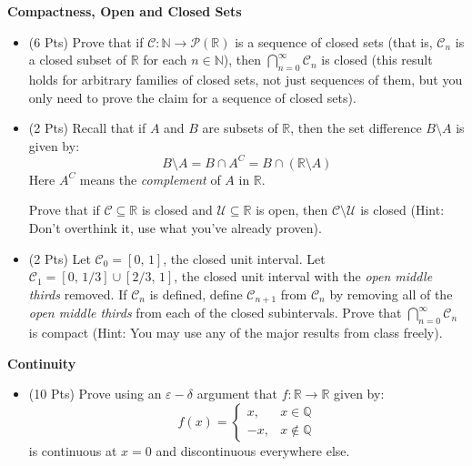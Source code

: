 \documentclass{article}
\begin{document}
    \newpage
    \textbf{Compactness, Open and Closed Sets}
    \begin{itemize}
        \item (6 Pts)
            Prove that if
            $\mathcal{C}:\mathbb{N}\rightarrow\mathcal{P}(\mathbb{R})$ is a
            sequence of closed sets (that is, $\mathcal{C}_{n}$ is a closed
            subset of $\mathbb{R}$ for each $n\in\mathbb{N}$), then
            $\bigcap_{n=0}^{\infty}\mathcal{C}_{n}$ is closed
            (this result holds for arbitrary families of closed sets, not
            just sequences of them, but you only need to prove the claim
            for a sequence of closed sets).
        \item
            (2 Pts)
            Recall that if $A$ and $B$ are subsets of $\mathbb{R}$, then
            the set difference $B\setminus{A}$ is given by:
            \begin{equation}
                B\setminus{A}
                =
                B\cap{A}^{C}
                =
                B\cap\left(\mathbb{R}\setminus{A}\right)
            \end{equation}
            Here $A^{C}$ means the \textit{complement} of $A$ in $\mathbb{R}$.

            Prove that if $\mathcal{C}\subseteq\mathbb{R}$ is closed and
            $\mathcal{U}\subseteq\mathbb{R}$ is open, then
            $\mathcal{C}\setminus\mathcal{U}$ is closed
            (Hint: Don't overthink it, use what you've already proven).
        \item
            (2 Pts)
            Let $\mathcal{C}_{0}=[0,\,1]$, the closed unit interval.
            Let $\mathcal{C}_{1}=[0,\,1/3]\cup[2/3,\,1]$, the closed unit
            interval with the \textit{open middle thirds} removed.
            If $\mathcal{C}_{n}$ is defined, define $\mathcal{C}_{n+1}$ from
            $\mathcal{C}_{n}$ by removing all of the
            \textit{open middle thirds} from each of the closed
            subintervals. Prove that $\bigcap_{n=0}^{\infty}\mathcal{C}_{n}$
            is compact
            (Hint: You may use any of the major results from class freely).
    \end{itemize}
    \newpage
    \textbf{Continuity}
    \begin{itemize}
        \item (10 Pts)
            Prove using an $\varepsilon-\delta$ argument that
            $f:\mathbb{R}\rightarrow\mathbb{R}$ given by:
            \begin{equation}
                f(x)
                =
                \begin{cases}
                    x,&x\in\mathbb{Q}\\
                    -x,&x\not\in\mathbb{Q}
                \end{cases}
            \end{equation}
            is continuous at $x=0$ and discontinuous everywhere else.
    \end{itemize}
\end{document}
